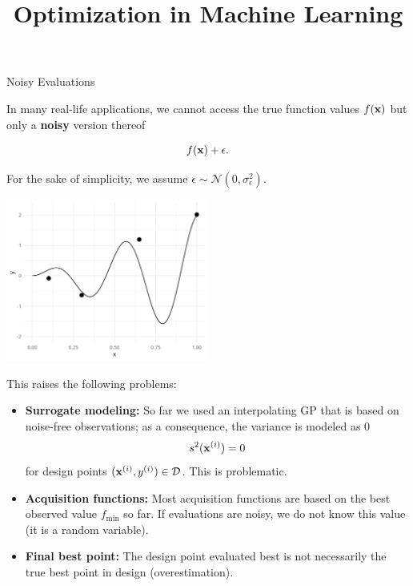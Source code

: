 \documentclass[11pt,compress,t,notes=noshow, xcolor=table]{beamer}
\title{Optimization in Machine Learning}
\date{}
\begin{document}


\begin{vbframe}{Noisy Evaluations}

In many real-life applications, we cannot access the true function values $f(\mathbf{x})$ but only a \textbf{noisy} version thereof

$$
  f(\mathbf{x}) + \epsilon. 
$$

For the sake of simplicity, we assume $\epsilon \sim \mathcal{N}\left(0, \sigma_\epsilon^2\right)$.

\begin{center}
  \includegraphics[width = 0.5\textwidth]{figure_man/noisy_0.png}
\end{center}

\framebreak 


This raises the following problems: 

\begin{itemize}
  \item \textbf{Surrogate modeling:} So far we used an interpolating GP that is based on noise-free observations; as a consequence, the variance is modeled as $0$
  $$
    s^2(\mathbf{x}^{(i)}) = 0
  $$
  for design points $(\mathbf{x}^{(i)}, y^{(i)}) \in \mathcal{D}$. This is problematic. 
  \item \textbf{Acquisition functions:} Most acquisition functions are based on the best observed value $f_{\min}$ so far. If evaluations are noisy, we do not know this value (it is a random variable).
  \item \textbf{Final best point:} The design point evaluated best is not necessarily the true best point in design (overestimation). 
\end{itemize}


\end{vbframe}
\end{document}
